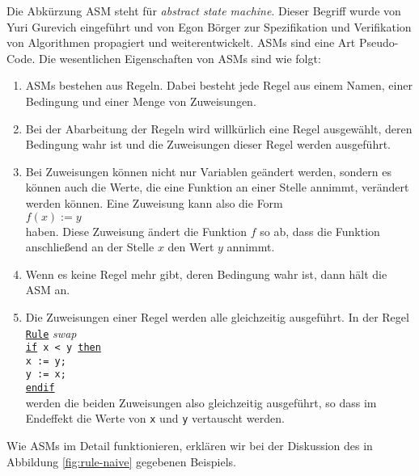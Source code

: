 Die Abk\"urzung \textsc{ASM} steht f\"ur \emph{abstract state machine}.
Dieser Begriff wurde von 
Yuri Gurevich \cite{gurevich:91} eingef\"uhrt und von Egon B\"orger \cite{boerger:2003} zur
Spezifikation und Verifikation von 
Algorithmen  propagiert und weiterentwickelt.  ASMs sind eine Art Pseudo-Code.  Die 
wesentlichen Eigenschaften von ASMs sind wie folgt:
\begin{enumerate}
\item ASMs bestehen aus Regeln.  Dabei besteht jede Regel
      aus einem Namen, einer Bedingung und einer Menge von Zuweisungen.
\item Bei der Abarbeitung der Regeln wird willk\"urlich eine Regel ausgew\"ahlt, deren
      Bedingung wahr ist und die Zuweisungen dieser Regel werden ausgef\"uhrt.
\item Bei Zuweisungen k\"onnen nicht nur Variablen ge\"andert werden, sondern es k\"onnen auch die Werte,
      die eine Funktion an einer Stelle annimmt, ver\"andert werden k\"onnen.  Eine Zuweisung
      kann also die Form
      \\[0.2cm]
      \hspace*{1.3cm}
      $f(x) := y$
      \\[0.2cm]
      haben.  Diese Zuweisung \"andert die Funktion $f$ so ab, dass die Funktion anschlie{\ss}end an der Stelle $x$
      den Wert $y$ annimmt.
\item Wenn es keine Regel mehr gibt, deren Bedingung wahr ist, dann h\"alt die ASM an.
\item Die Zuweisungen einer Regel werden alle gleichzeitig ausgef\"uhrt.  In der Regel 
      \\[0.2cm]
      \hspace*{0.8cm} \texttt{\underline{Rule}} \textsl{swap}            \\
      \hspace*{1.3cm} \texttt{\underline{if} x < y \underline{then}}     \\
      \hspace*{1.8cm} \texttt{x := y;}                                   \\
      \hspace*{1.8cm} \texttt{y := x;}                                   \\
      \hspace*{1.3cm} \texttt{\underline{endif}}                         \\[0.2cm]
      werden die beiden Zuweisungen also gleichzeitig ausgef\"uhrt, so dass im Endeffekt die
      Werte von \texttt{x} und \texttt{y} vertauscht werden.
\end{enumerate}
Wie ASMs im Detail funktionieren, erkl\"aren wir bei der Diskussion des in Abbildung
\ref{fig:rule-naive} gegebenen Beispiels.

